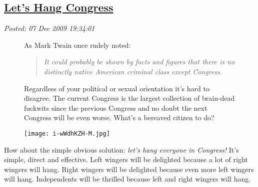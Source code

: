 %

\subsection*{\href{https://bakerjd99.wordpress.com/2009/12/07/lets-hang-congress/}{Let's Hang Congress}}


\noindent\emph{Posted: 07 Dec 2009 19:34:01}
\vspace{6pt}


\begin{figure}[ht]
\begin{minipage}[b]{0.50\textwidth}
As
Mark Twain once rudely noted:

\medskip

\begin{quotation}
\emph{It could probably be shown by facts and figures that there is no
distinctly native American criminal class except Congress.}
\end{quotation}

\medskip


Regardless of your political or sexual orientation it's hard to
disagree. The current Congress is the largest collection of brain-dead
fuckwits since the previous Congress and no doubt the next Congress will
be even worse. What's a bereaved citizen to do?
\end{minipage}
\hspace{1pt}
\begin{minipage}[b]{0.45\textwidth}
\centering
\texttt{[image: i-wWdhKZH-M.jpg]}
\label{fig:302X0}
\end{minipage}
\end{figure}

How about the simple obvious solution: \emph{let's hang everyone in
Congress!} It's simple, direct and effective. Left wingers will be
delighted because a lot of right wingers will hang. Right wingers will
be delighted because even more left wingers will hang. Independents will
be thrilled because left and right wingers will hang.

